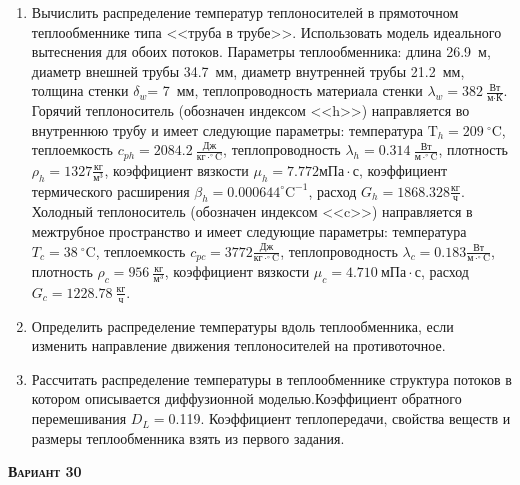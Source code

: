 \begin{enumerate} 
\item Вычислить распределение температур теплоносителей в прямоточном теплообменнике типа <<труба в трубе>>. Использовать модель идеального вытеснения для обоих потоков. Параметры теплообменника: длина  26.9~м, диаметр внешней трубы 34.7~мм,  диаметр внутренней трубы 21.2~мм, толщина стенки $\delta_{w}$=     7~мм,  теплопроводность материала стенки $\lambda_{w}=  382~\frac{\text{Вт}}{\text{м} \cdot \text{К}}$.  Горячий теплоноситель (обозначен индексом <<h>>) направляется во внутреннюю трубу и	 имеет следующие параметры: температура $\text{T}_{h}= 209~^\circ\mathrm{C}$, теплоемкость	  $c_{p{h}}= 2084.2~\frac{\text{Дж}}{\text{кг} \cdot ^\circ\mathrm{C}}$, теплопроводность 		$\lambda_{h}= 0.314~\frac{\text{Вт}}{\text{м} \cdot ^\circ\mathrm{C}}$, плотность 		$\rho_{h}= 1327 \frac{\text{кг}}{\text{м}^3}$, коэффициент вязкости $\mu_{h}=7.772 \text{мПа} 		\cdot \text{с} $, коэффициент термического расширения $\beta_{h}=0.000644 ^\circ\mathrm{C}^{-1}$,		 расход $G_{h}= 1868.328 \frac{\text{кг}}{\text{ч}}$. Холодный теплоноситель (обозначен индексом <<c>>) 		 направляется в межтрубное пространство и имеет следующие параметры: температура $T_{c}=   38		 ~^\circ\mathrm{C}$, теплоемкость $c_{p{c}}= 3772 \frac{\text{Дж}}{\text{кг} \cdot ^\circ\mathrm{C}}$,			 теплопроводность $\lambda_{c}=0.183 \frac{\text{Вт}}{\text{м} \cdot ^\circ\mathrm{C}}$, плотность 			 $\rho_{c}=   956~\frac{\text{кг}}{\text{м}^3}$, коэффициент вязкости $\mu_{c}=4.710~\text{мПа} \cdot \text{с} $, 			 расход $G_{c}=1228.78~\frac{\text{кг}}{\text{ч}}$. 

\item Определить распределение температуры вдоль теплообменника, если 	изменить направление движения теплоносителей на противоточное.

\item Рассчитать распределение температуры в теплообменнике структура потоков в котором описывается диффузионной моделью.Коэффициент обратного перемешивания $D_L = $0.119. Коэффициент теплопередачи, свойства веществ и размеры теплообменника взять из первого задания. 

\end{enumerate}

\textsc{\textbf{Вариант 30}}

